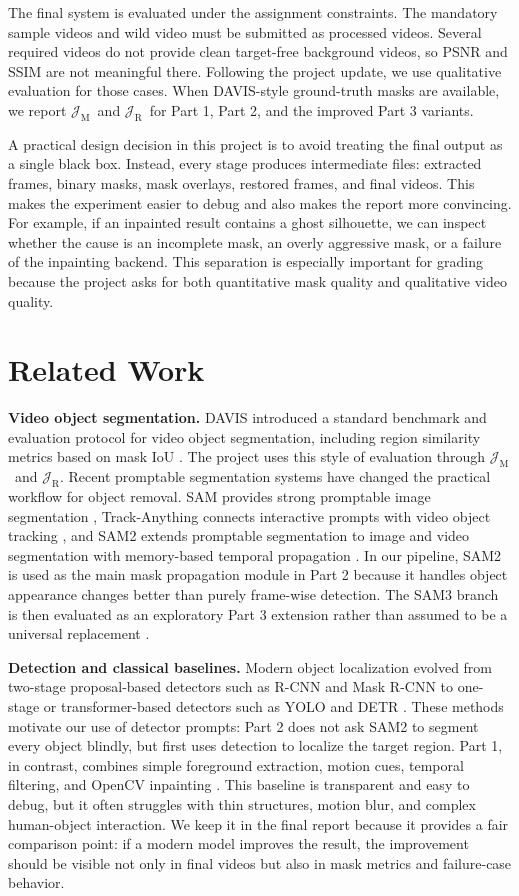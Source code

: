 \documentclass[10pt,twocolumn,letterpaper]{article}
\newcommand{\jm}{\ensuremath{\mathcal{J}_{\mathrm{M}}}}
\newcommand{\jr}{\ensuremath{\mathcal{J}_{\mathrm{R}}}}
\begin{document}
The final system is evaluated under the assignment constraints. The mandatory sample videos and wild video must be submitted as processed videos. Several required videos do not provide clean target-free background videos, so PSNR and SSIM are not meaningful there. Following the project update, we use qualitative evaluation for those cases. When DAVIS-style ground-truth masks are available, we report \jm\ and \jr\ for Part 1, Part 2, and the improved Part 3 variants.

A practical design decision in this project is to avoid treating the final output as a single black box. Instead, every stage produces intermediate files: extracted frames, binary masks, mask overlays, restored frames, and final videos. This makes the experiment easier to debug and also makes the report more convincing. For example, if an inpainted result contains a ghost silhouette, we can inspect whether the cause is an incomplete mask, an overly aggressive mask, or a failure of the inpainting backend. This separation is especially important for grading because the project asks for both quantitative mask quality and qualitative video quality.

\section{Related Work}
\textbf{Video object segmentation.} DAVIS introduced a standard benchmark and evaluation protocol for video object segmentation, including region similarity metrics based on mask IoU \cite{davis}. The project uses this style of evaluation through \jm\ and \jr. Recent promptable segmentation systems have changed the practical workflow for object removal. SAM provides strong promptable image segmentation \cite{sam}, Track-Anything connects interactive prompts with video object tracking \cite{trackanything}, and SAM2 extends promptable segmentation to image and video segmentation with memory-based temporal propagation \cite{sam2}. In our pipeline, SAM2 is used as the main mask propagation module in Part 2 because it handles object appearance changes better than purely frame-wise detection. The SAM3 branch is then evaluated as an exploratory Part 3 extension rather than assumed to be a universal replacement \cite{sam3}.

\textbf{Detection and classical baselines.} Modern object localization evolved from two-stage proposal-based detectors such as R-CNN and Mask R-CNN to one-stage or transformer-based detectors such as YOLO and DETR \cite{rcnn,maskrcnn,yolo,detr}. These methods motivate our use of detector prompts: Part 2 does not ask SAM2 to segment every object blindly, but first uses detection to localize the target region. Part 1, in contrast, combines simple foreground extraction, motion cues, temporal filtering, and OpenCV inpainting \cite{opencv}. This baseline is transparent and easy to debug, but it often struggles with thin structures, motion blur, and complex human-object interaction. We keep it in the final report because it provides a fair comparison point: if a modern model improves the result, the improvement should be visible not only in final videos but also in mask metrics and failure-case behavior.
\end{document}
